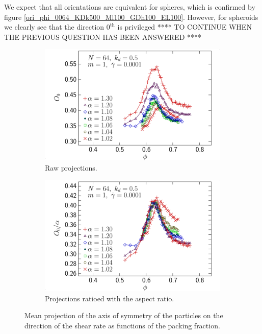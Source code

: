\documentclass[class=report, float=false, crop=false]{standalone}
\begin{document}
We expect that all orientations are equivalent for spheres, which is confirmed by figure \ref{ori_phi_0064_KDk500_Ml100_GDh100_EL100}. However, for spheroids we clearly see that the direction $0^{\text{th}}$ is privileged **** TO CONTINUE WHEN THE PREVIOUS QUESTION HAS BEEN ANSWERED ****


\begin{figure}[h!]
\centering
    \begin{subfigure}[t]{0.49\textwidth}
        \centering
        \includegraphics[width=\textwidth]{figures/figs/ori0_phi_prolate_0064_KDk500_Ml100_GDh100}
        \caption{Raw projections.}
        \label{ori0_phi_prolate_0064_KDk500_Ml100_GDh100}
    \end{subfigure}
    \hfill
    \begin{subfigure}[t]{0.49\textwidth}
        \centering
        \includegraphics[width=\textwidth]{figures/figs/ori0al_phi_prolate_0064_KDk500_Ml100_GDh100}
        \caption{Projections ratioed with the aspect ratio.}
        \label{ori0al_phi_prolate_0064_KDk500_Ml100_GDh100}
    \end{subfigure}
    \caption{Mean projection of the axis of symmetry of the particles on the direction of the shear rate as functions of the packing fraction.}
    \label{ori_phi_0064}
\end{figure}
\end{document}
